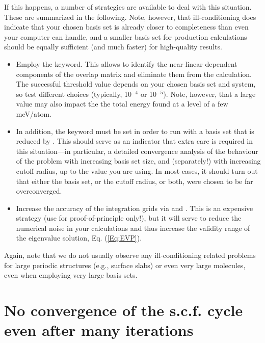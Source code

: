 If this happens, a number of strategies are available to deal with
this situation. These are summarized in the following. Note, however,
that ill-conditioning does indicate that your chosen basis set is
already closer to completeness than even your computer can handle, and
a smaller basis set for production calculations should be equally
sufficient (and much faster) for high-quality results. 
\begin{itemize}
  \item Employ the  keyword. This allows to
    identify the near-linear dependent components of the overlap matrix
    and eliminate them from the calculation. The successful threshold
    value depends on your chosen basis set and system, so test
    different choices (typically, 10$^{-4}$ or 10$^{-5}$). Note,
    however, that a large  value may also
    impact the the total energy found at a level of a few meV/atom.
  \item In addition, the keyword 
    must be set in order to run with a basis set that is reduced by
    . This should serve as an indicator that
    extra care is required in this situation---in particular, a
    detailed convergence analysis of the behaviour of the problem with
    increasing basis set size, and (separately!) with increasing
    cutoff radius, up to the value you are using. In most cases, it
    should turn out that either the basis set, or the cutoff radius,
    or both, were chosen to be far overconverged.
  \item Increase the accuracy of the integration grids via
     and
    . This is an
    expensive strategy (use for proof-of-principle only!), but it will
    serve to reduce the numerical noise in your calculations and thus
    increase the validity range of the eigenvalue solution,
    Eq. (\ref{Eq:EVP}). 
\end{itemize}
Again, note that we do not usually observe any ill-conditioning
related problems for large periodic structures (e.g., surface slabs)
or even very large molecules, even when employing very large basis
sets. 

\section{No convergence of the s.c.f. cycle even after many iterations}
\label{sec:trouble-scf}

